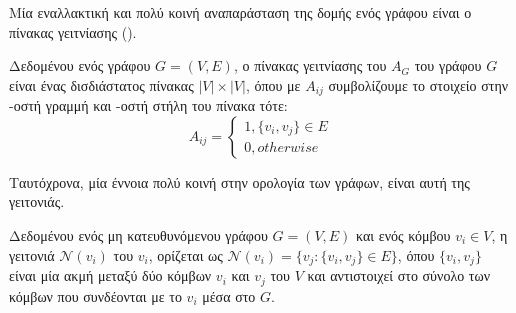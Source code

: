Μία εναλλακτική και πολύ κοινή αναπαράσταση της δομής ενός γράφου είναι ο πίνακας γειτνίασης ().
\begin{definition}
Δεδομένου ενός γράφου $G = ( V, E )$, ο πίνακας γειτνίασης του $A_{G}$ του γράφου $G$ είναι ένας δισδιάστατος πίνακας $|V|\times |V|$, όπου με $Α_{ij}$ συμβολίζουμε το στοιχείο στην -οστή γραμμή και -οστή στήλη του πίνακα τότε:
\begin{equation}
 A_{ij} =
\begin{cases}
1, \{v_{i}, v_{j}\} \in E\\
0, otherwise
\end{cases}
\end{equation}
\label{def:adjacency_matrix}
\end{definition}

Ταυτόχρονα, μία έννοια πολύ κοινή στην ορολογία των γράφων, είναι αυτή της γειτονιάς.
\begin{definition}[Γειτονιά]
Δεδομένου ενός μη κατευθυνόμενου γράφου $G = ( V, E )$ και ενός κόμβου $v_{i} \in V$,
η γειτονιά $\mathcal{N}(v_{i})$ του $v_{i}$, ορίζεται ως $\mathcal{N}(v_{i}) = \{v_{j} : \{v_{i}, v_{j}\} \in E\}$, όπου $\{v_{i}, v_{j}\}$ είναι μία ακμή μεταξύ δύο κόμβων $v_{i}$ και $v_{j}$ του $V$ και αντιστοιχεί στο σύνολο των κόμβων που συνδέονται με το $v_{i}$ μέσα στο $G$.
\end{definition}

